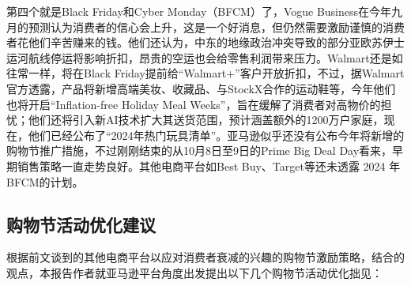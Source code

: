 \documentclass[12pt]{ctexart}
\begin{document}
第四个就是Black Friday和Cyber Monday（BFCM）了，Vogue Business在今年九月的预测认为消费者的信心会上升，这是一个好消息，但仍然需要激励谨慎的消费者花他们辛苦赚来的钱\cite{29}。他们还认为，中东的地缘政治冲突导致的部分亚欧苏伊士运河航线停运将影响折扣，昂贵的空运也会给零售利润带来压力。Walmart还是如往常一样，将在Black Friday提前给“Walmart+”客户开放折扣，不过，据Walmart官方透露，产品将新增高端美妆、收藏品、与StockX合作的运动鞋等，今年他们也将开启“Inflation-free Holiday Meal Weeks”，旨在缓解了消费者对高物价的担忧；他们还将引入新AI技术扩大其送货范围，预计涵盖额外的1200万户家庭，现在，他们已经公布了“2024年热门玩具清单”\cite{30}。亚马逊似乎还没有公布今年将新增的购物节推广措施，不过刚刚结束的从10月8日至9日的Prime Big Deal Day看来，早期销售策略一直走势良好。其他电商平台如Best Buy、Target等还未透露 2024 年BFCM的计划\cite{31}。

\subsection{购物节活动优化建议}

根据前文谈到的其他电商平台以应对消费者衰减的兴趣的购物节激励策略，结合\cite{26,32}的观点，本报告作者就亚马逊平台角度出发提出以下几个购物节活动优化拙见：
\end{document}
